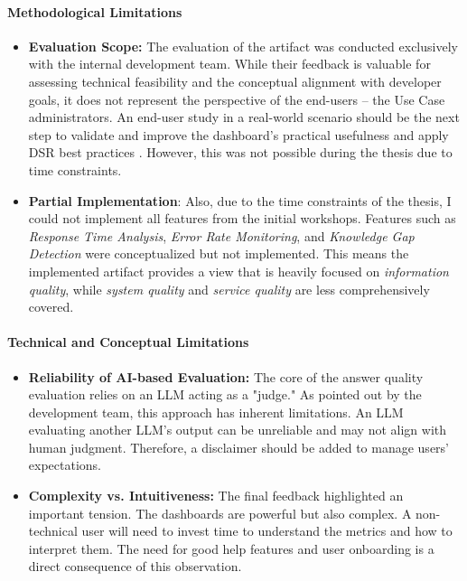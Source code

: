 \documentclass[
	english,
	ruledheaders=section,%
	class=report,%
	thesis={type=bachelor},%
	accentcolor=1b,%
	custommargins=true,%
	marginpar=false,%
	parskip=half-,%
	fontsize=11pt,%
	DIV=14,
]{tudapub}
\begin{document}
\paragraph{Methodological Limitations}
\begin{itemize}
    \item \textbf{Evaluation Scope:} The evaluation of the artifact was conducted exclusively with the internal development team. While their feedback is valuable for assessing technical feasibility and the conceptual alignment with developer goals, it does not represent the perspective of the end-users -- the Use Case administrators. An end-user study in a real-world scenario should be the next step to validate and improve the dashboard's practical usefulness and apply DSR best practices \parencite{Peffers2007}. However, this was not possible during the thesis due to time constraints.
    \item \textbf{Partial Implementation}: Also, due to the time constraints of the thesis, I could not implement all features from the initial workshops. Features such as \textit{Response Time Analysis}, \textit{Error Rate Monitoring}, and \textit{Knowledge Gap Detection} were conceptualized but not implemented. This means the implemented artifact provides a view that is heavily focused on \textit{information quality}, while \textit{system quality} and \textit{service quality} are less comprehensively covered.
\end{itemize}

\paragraph{Technical and Conceptual Limitations}
\begin{itemize}
    \item \textbf{Reliability of AI-based Evaluation:} The core of the answer quality evaluation relies on an LLM acting as a "judge." As pointed out by the development team, this approach has inherent limitations. An LLM evaluating another LLM's output can be unreliable and may not align with human judgment. Therefore, a disclaimer should be added to manage users' expectations.
    \item \textbf{Complexity vs. Intuitiveness:} The final feedback highlighted an important tension. The dashboards are powerful but also complex. A non-technical user will need to invest time to understand the metrics and how to interpret them. The need for good help features and user onboarding is a direct consequence of this observation.
\end{itemize}
\end{document}
